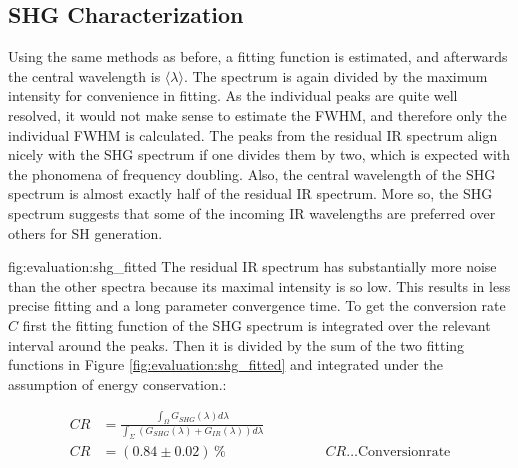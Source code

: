 \subsection{SHG Characterization}
Using the same methods as before, a fitting function is estimated, and afterwards the central wavelength is $\langle \lambda \rangle$.
The spectrum is again divided by the maximum intensity for convenience in fitting.
As the individual peaks are quite well resolved, it would not make sense to estimate the FWHM, and therefore only the individual FWHM is calculated.
The peaks from the residual IR spectrum align nicely with the SHG spectrum if one divides them by two, which is expected with the phonomena of frequency doubling.
Also, the central wavelength of the SHG spectrum is almost exactly half of the residual IR spectrum.
More so, the SHG spectrum suggests that some of the incoming IR wavelengths are preferred over others for SH generation.

    {fig:evaluation:shg_fitted}
\noindent The residual IR spectrum has substantially more noise than the other spectra because its maximal intensity is so low.
This results in less precise fitting and a long parameter convergence time.
To get the conversion rate $C$ first the fitting function of the SHG spectrum is integrated over the relevant interval around the peaks. 
Then it is divided by the sum of the two fitting functions in Figure \ref{fig:evaluation:shg_fitted} and integrated under the assumption of energy conservation.:
    
\begin{align}
    CR &= \frac{\int_{\varOmega} G_{SHG}(\lambda) d \lambda}{ \int_{\Sigma} (G_{SHG}(\lambda) + G_{IR}(\lambda))d \lambda} \\
    CR &= (0.84 \pm 0.02)  \hspace{2pt} \% \hspace{3cm} CR \ldots \text{Conversionrate}
\end{align}

